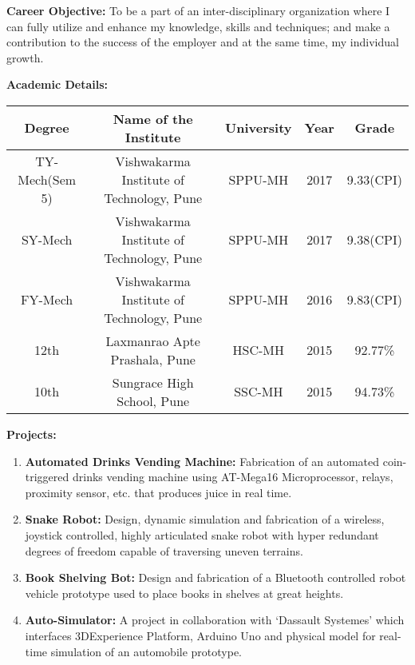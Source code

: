 \documentclass{article}
\begin{document}
	\begin{flushleft}
		\textbf{Career Objective:} To be a part of an inter-disciplinary organization where I can fully utilize and enhance my knowledge, skills and techniques; and make a contribution to the success of the employer and at the same time, my individual growth.
		
		\medskip
		\textbf{Academic Details:} 
		\begin{center}
			\begin{tabular}{||c|c|c|c|c||} 
				\hline
				\textbf{Degree} & \textbf{Name of the Institute} & \textbf{University} & \textbf{Year} & \textbf{Grade} \\  
				\hline\hline
				TY-Mech(Sem 5) & Vishwakarma Institute of Technology, Pune & SPPU-MH & 2017 & 9.33(CPI)\\ 
				\hline
				SY-Mech & Vishwakarma Institute of Technology, Pune & SPPU-MH & 2017 & 9.38(CPI)\\ 
				\hline
				FY-Mech & Vishwakarma Institute of Technology, Pune & SPPU-MH & 2016 & 9.83(CPI)\\ 
				\hline
				12th & Laxmanrao Apte Prashala, Pune & HSC-MH & 2015 & 92.77\%\\ 
				\hline
				10th & Sungrace High School, Pune & SSC-MH & 2015 & 94.73\%\\   
				\hline
			\end{tabular}
		\end{center}
		
		\medskip
		\textbf{Projects:} 
		\begin{enumerate}
			\item \textbf{Automated Drinks Vending Machine:} Fabrication of an automated coin-triggered drinks vending machine using AT-Mega16 Microprocessor, relays, proximity sensor, etc. that produces juice in real time.
			\item \textbf{Snake Robot:} Design, dynamic simulation and fabrication of a wireless, joystick controlled, highly articulated snake robot with hyper redundant degrees of freedom capable of traversing uneven terrains.
			\item \textbf{Book Shelving Bot:} Design and fabrication of a Bluetooth controlled robot vehicle prototype used to place books in shelves at great heights.
			\item \textbf{Auto-Simulator:} A project in collaboration with ‘Dassault Systemes’ which interfaces 3DExperience Platform, Arduino Uno and physical model for real-time simulation of an automobile prototype.
		\end{enumerate}
		

\end{flushleft}
\end{document}
